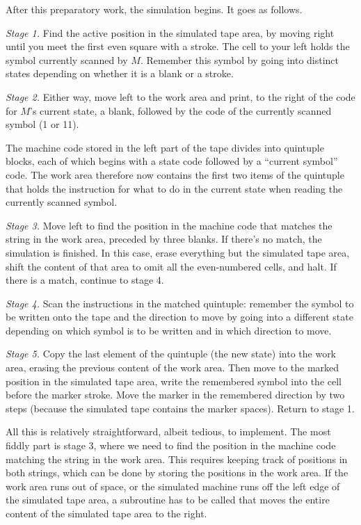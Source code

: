 After this preparatory work,
the simulation begins.
It goes as follows.

\emph{Stage 1.}
Find the active position in the simulated tape area,
by moving right until you meet the first even square with a stroke.
The cell to your left holds the symbol currently scanned by $M$.
Remember this symbol by
going into distinct states depending on whether it is a blank or a stroke.

\emph{Stage 2.}
Either way, move left to the work area and print,
to the right of the code for $M$'s current state,
a blank, followed by the code of the currently scanned symbol
(1 or 11).

The machine code stored in the left part of the tape
divides into quintuple blocks,
each of which begins with a state code followed by a ``current symbol'' code.
The work area therefore now contains
the first two items of the quintuple that holds the instruction for what to do in the current state
when reading the currently scanned symbol.

\emph{Stage 3.}
Move left to find the position in the machine code that matches
the string in the work area,
preceded by three blanks.
If there's no match,
the simulation is finished.
In this case,
erase everything but the simulated tape area,
shift the content of that area to omit all the even-numbered cells,
and halt.
If there is a match,
continue to stage 4.

\emph{Stage 4.}
Scan the instructions in the matched quintuple:
remember the symbol to be written onto the tape and the direction to move
by going into a different state depending on which symbol is to be written
and in which direction to move.

\emph{Stage 5.}
Copy the last element of the quintuple
(the new state)
into the work area,
erasing the previous content of the work area.
Then move to the marked position in the simulated tape area,
write the remembered symbol
into the cell before the marker stroke.
Move the marker in the remembered direction
by two steps
(because the simulated tape contains the marker spaces).
Return to stage 1.

All this is relatively straightforward,
albeit tedious,
to implement.
The most fiddly part is stage 3,
where we need to find the position in the machine code matching the string in the work area.
This requires keeping track of positions in both strings,
which can be done by storing the positions in the work area.
If the work area runs out of space,
or the simulated machine runs off the left edge
of the simulated tape area,
a subroutine has to be called that
moves the entire content of the simulated tape area to the right.

